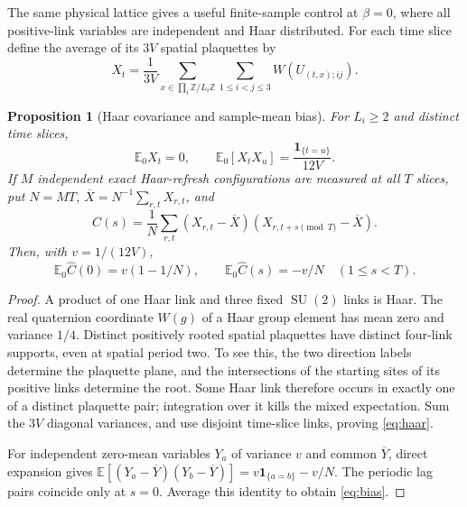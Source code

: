 \documentclass[11pt,a4paper]{article}
\numberwithin{equation}{section}
\newtheorem{proposition}[theorem]{Proposition}
\newcommand{\SU}{\operatorname{SU}(2)}
\newcommand{\E}{\mathbb E}
\begin{document}
The same physical lattice gives a useful finite-sample
control at \(\beta=0\), where all positive-link variables
are independent and Haar distributed. For each time slice
define the average of its \(3V\) spatial plaquettes by
\begin{equation}
 X_t=\frac1{3V}\sum_{x\in\prod_i\mathbb Z/L_i\mathbb Z}
                 \sum_{1\leq i<j\leq3}W(U_{(t,x);ij}).
                                                        \label{eq:X}
\end{equation}
\begin{proposition}[Haar covariance and sample-mean bias]
\label{prop:haar}
For \(L_i\geq2\) and distinct time slices,
\begin{equation}
 \E_0X_t=0,\qquad
 \E_0[X_tX_u]=\frac{\mathbf1_{\{t=u\}}}{12V}.
                                                        \label{eq:haar}
\end{equation}
If \(M\) independent exact Haar-refresh configurations
are measured at all \(T\) slices, put \(N=MT\),
\(\overline X=N^{-1}\sum_{r,t}X_{r,t}\), and
\[
 \widehat C(s)=\frac1N\sum_{r,t}
 (X_{r,t}-\overline X)
 (X_{r,t+s\pmod T}-\overline X).
\]
Then, with \(v=1/(12V)\),
\begin{equation}
 \E_0\widehat C(0)=v(1-1/N),\qquad
 \E_0\widehat C(s)=-v/N\quad(1\leq s<T).
                                                        \label{eq:bias}
\end{equation}
\end{proposition}
\begin{proof}
A product of one Haar link and three fixed \(\SU\)
links is Haar. The real quaternion coordinate
\(W(g)\) of a Haar group element has mean zero and
variance \(1/4\). Distinct positively rooted
spatial plaquettes have distinct four-link supports,
even at spatial period two. To see this, the two
direction labels determine the plaquette plane,
and the intersections of the starting sites of its
positive links determine the root. Some Haar link
therefore occurs in exactly one of a distinct
plaquette pair; integration over it kills the
mixed expectation. Sum the \(3V\) diagonal variances,
and use disjoint time-slice links, proving \eqref{eq:haar}.

For independent zero-mean variables
\(Y_a\) of variance \(v\) and common
\(\overline Y\), direct expansion gives
\(\E[(Y_a-\overline Y)(Y_b-\overline Y)]
 =v\mathbf1_{\{a=b\}}-v/N\).
The periodic lag pairs coincide only at \(s=0\).
Average this identity to obtain \eqref{eq:bias}.
\end{proof}
\end{document}
